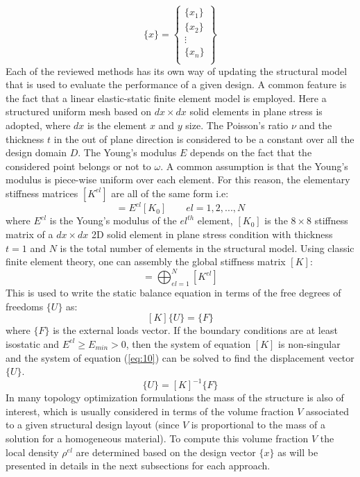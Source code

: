 \begin{equation}
     \lbrace x\rbrace=\left\lbrace\begin{array}{c}
          \lbrace x_1\rbrace  \\
           \lbrace x_2\rbrace  \\
           \vdots  \\
           \lbrace x_n\rbrace  \\
     \end{array}\right\rbrace
\end{equation}
Each of the reviewed methods has its own way of updating the structural model that is used to evaluate the performance of a given design. A common feature is the fact that a linear elastic-static finite element model is employed. Here a structured uniform mesh based on $dx\times dx$ solid elements in plane stress is adopted, where $dx$ is the element $x$ and $y$ size. The Poisson's ratio $\nu$ and the thickness $t$ in the out of plane direction is considered to be a constant over all the design domain $D$. The Young's modulus $E$ depends on the fact that the considered point belongs or not to $\omega$.  
A common assumption is that the Young's modulus is piece-wise uniform over each element.
For this reason, the elementary stiffness matrices $[{K}^{el}]$ are all of the same form i.e:
\begin{equation}
    [{K}^{el}]=E^{el}[{K}_0] \quad \quad  el=1,2,...,N
\end{equation}
where $E^{el}$ is the Young's modulus of the $el^{th}$ element, $[{K}_0]$ is the $8 \times 8$ stiffness matrix of a $dx\times dx$ 2D solid element in plane stress condition with thickness $t=1$ and $N$ is the total number of elements in the structural model.  
Using classic finite element theory, one can assembly the global stiffness matrix $[{K}]$:
\begin{equation}
    [{K}]=\bigoplus_{el=1}^{N} [{K}^{el}]
\end{equation}
This is used to write the static balance equation in terms of the free degrees of freedoms $\lbrace{U}\rbrace$ as:
\begin{equation}
\label{eq:10}
    [{K}]\lbrace{U}\rbrace=\lbrace{F}\rbrace
\end{equation}
where $\lbrace{F}\rbrace$ is the external loads vector. If the boundary conditions are at least isostatic and $ E^{el}\geq E_{min}>0$, then the system of equation  $[{K}]$ is non-singular and the system of equation (\ref{eq:10}) can be solved to find the displacement vector $\lbrace{U}\rbrace$.
\begin{equation}
    \lbrace{U}\rbrace=[{K}]^{-1}\lbrace{F}\rbrace
\end{equation}
In many topology optimization formulations the mass of the structure is also of interest, which is usually considered in terms of the volume fraction $V$ associated to a given structural design layout (since $V$ is proportional to the mass of a solution for a homogeneous material). To compute this volume fraction $V$ the local density $\rho^{el}$ are determined based on the design vector $\lbrace {x}\rbrace$ as will be presented in details in the next subsections for each approach.

